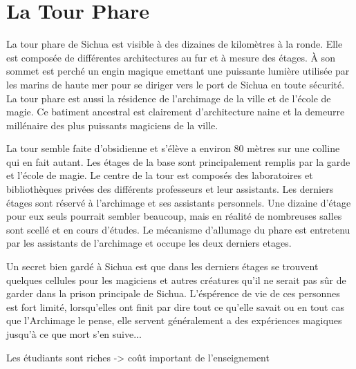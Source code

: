\section{La Tour Phare}

La tour phare de Sichua est visible à des dizaines de kilomètres à la ronde.
Elle est composée de différentes architectures au fur et à mesure des étages.
À son sommet est perché un engin magique emettant une puissante lumière 
utilisée par les marins de haute mer pour se diriger vers le port de Sichua
en toute sécurité. La tour phare est aussi la résidence de l'archimage de la 
ville et de l'école de magie. Ce batiment ancestral est clairement 
d'architecture naine et la demeurre millénaire des plus puissants magiciens 
de la ville.

La tour semble faite d'obsidienne et s'élève a environ 80 mètres sur une 
colline qui en fait autant. Les étages de la base sont principalement 
remplis par la garde et l'école de magie. Le centre de la tour est 
composés des laboratoires et bibliothèques privées des différents 
professeurs et leur assistants. 
Les derniers étages sont réservé à l'archimage et ses assistants personnels.
Une dizaine d'étage pour eux seuls pourrait sembler beaucoup, mais en 
réalité de nombreuses salles sont scellé et en cours d'études. Le mécanisme
d'allumage du phare est entretenu par les assistants de l'archimage et 
occupe les deux derniers etages.

Un secret bien gardé à Sichua est que dans les derniers étages
se trouvent quelques cellules pour les magiciens et autres créatures
qu'il ne serait pas sûr de garder dans la prison principale de Sichua.
L'éspérence de vie de ces personnes est fort limité, lorsqu'elles ont finit
par dire tout ce qu'elle savait ou en tout cas que l'Archimage le pense,
elle servent généralement a des expériences magiques jusqu'à ce que mort
s'en suive...

Les étudiants sont riches -> coût important de l'enseignement

